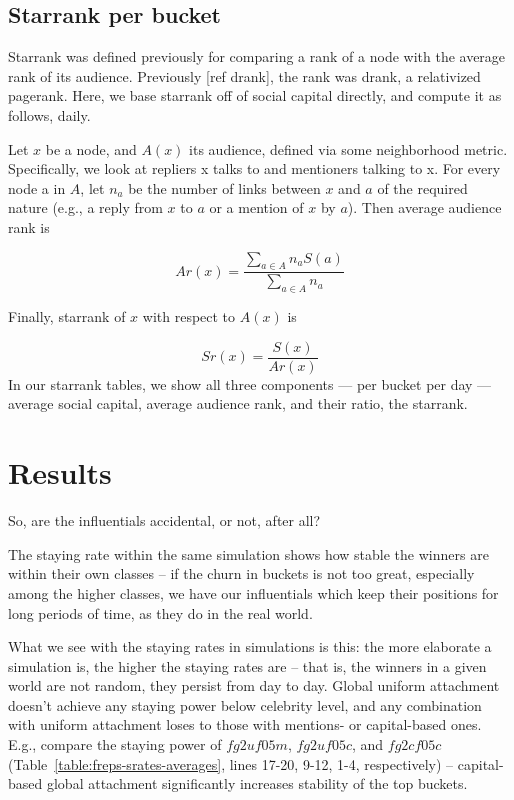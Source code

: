 \documentclass[10pt,oneside]{memoir}
\begin{document}
\subsection{Starrank per bucket}
\label{starrankperbucket}

Starrank was defined previously for comparing a rank of a node with the average rank of its audience.  Previously [ref drank], the rank was drank, a relativized pagerank.  Here, we base starrank off of social capital directly, and compute it as follows, daily.



Let $x$ be a node, and $A(x)$ its audience, defined via some neighborhood metric.  Specifically, we look at repliers x talks to and mentioners talking to x.  For every node a in $A$, let $n_a$ be the number of links between $x$ and $a$ of the required nature (e.g., a reply from $x$ to $a$ or a mention of $x$ by $a$).  Then average audience rank is

\[ Ar(x) = \frac{\sum_{a \in A} n_a S(a)}{\sum_{a \in A} n_a} \]

Finally, starrank of $x$ with respect to $A(x)$ is

\[ Sr(x) = \frac{S(x)}{Ar(x)} \]
In our starrank tables, we show all three components --- per bucket per day --- average social capital, average audience rank, and their ratio, the starrank.


\section{Results}
\label{results}

\label{sec:simulation-results}
So, are the influentials accidental, or not, after all?


The staying rate within the same simulation shows how stable the winners are within their own classes -- if the churn in buckets is not too great, especially among the higher classes, we have our influentials which keep their positions for long periods of time, as they do in the real world.


What we see with the staying rates in simulations is this: the more elaborate a simulation is, the higher the staying rates are -- that is, the winners in a given world are not random, they persist from day to day.  Global uniform attachment doesn't achieve any staying power below celebrity level, and any combination with uniform attachment loses to those with mentions- or capital-based ones.  E.g., compare the staying power of $fg2uf05m$, $fg2uf05c$, and $fg2cf05c$ (Table~\ref{table:freps-srates-averages}, lines 17-20, 9-12, 1-4, respectively) -- capital-based global attachment significantly increases stability of the top buckets.
\end{document}
